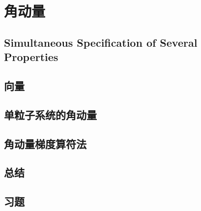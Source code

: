 \chapter{角动量}
\label{chap:5}
\section{Simultaneous Specification of Several Properties}
\label{sec:5.1 Simultaneous Specification of Several Properties}

\section{向量}
\label{sec:5.2 Vectors}

\section{单粒子系统的角动量}
\label{sec:5.3 Angular Momentum of a One-Particle System}

\section{角动量梯度算符法}
\label{sec:5.4 The Ladder-Operator Method for Angular Momentum}

\section*{总结}

\section*{习题}
